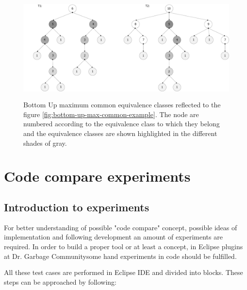 \documentclass{report}
\begin{document}
\begin{figure}[th]
  \centering
  \includegraphics[scale=0.45]{Figures/algorithms/BU/bottom-up-max-common-example-equivalence.pdf}\\[0.1cm]
  \caption[Bottom Up maximum common equivalence classes for figure.] { Bottom Up maximum common equivalence classes reflected to the figure \ref{fig:bottom-up-max-common-example}. The node are numbered according to the equivalence class to which they belong and the equivalence classes are shown highlighted in the different shades of gray\cite{valiente}.}
  \label{fig:bottom-up-max-common-example-equivalence}
\end{figure}


\chapter{Code compare experiments}
\label{cha:experimental}
\section{Introduction to experiments}

For better understanding of possible "code compare" concept, possible ideas of implementation and following development an amount of experiments are required.
In order to build a proper tool or at least a concept, in Eclipse plugins at Dr. Garbage Community\textregistered \enspace some hand experiments in code should be fulfilled.

All these test cases are performed in Eclipse IDE \cite{eclipse_site} and divided into blocks. These steps can be approached by following:
\end{document}
